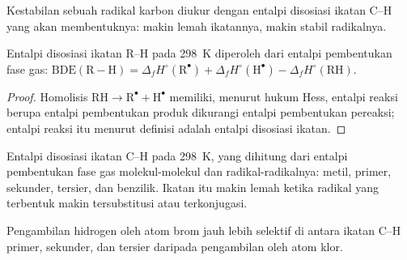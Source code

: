 Kestabilan sebuah radikal karbon diukur dengan entalpi disosiasi ikatan
C--H yang akan membentuknya: makin lemah ikatannya, makin
stabil radikalnya.

\begin{proposition}\label{prop:b3:radicals-carbenes:bde}
Entalpi disosiasi ikatan R--H pada \qty{298}{K} diperoleh dari entalpi pembentukan
fase gas: $\mathrm{BDE(R{-}H)} = \Delta_fH^\circ(\mathrm R^\bullet) + \Delta_fH^\circ(\mathrm H^\bullet) - \Delta_fH^\circ(\mathrm{RH})$.
\end{proposition}

\begin{proof}
Homolisis $\mathrm{RH \to R^\bullet + H^\bullet}$ memiliki, menurut hukum Hess, entalpi reaksi berupa entalpi
pembentukan produk dikurangi entalpi pembentukan pereaksi; entalpi reaksi itu menurut definisi adalah
entalpi disosiasi ikatan.
\end{proof}

\begin{omfigure}

{\small Entalpi disosiasi ikatan C--H pada \qty{298}{K}, yang dihitung dari entalpi pembentukan
fase gas molekul-molekul dan radikal-radikalnya: metil, primer,
sekunder, tersier, dan benzilik. Ikatan itu makin lemah ketika radikal yang terbentuk
makin tersubstitusi atau terkonjugasi.}
\end{omfigure}

\begin{proposition}\label{prop:b3:radicals-carbenes:halogenation-selectivity}
Pengambilan hidrogen oleh atom brom jauh lebih selektif di antara ikatan C--H primer,
sekunder, dan tersier daripada pengambilan oleh atom klor.
\end{proposition}


